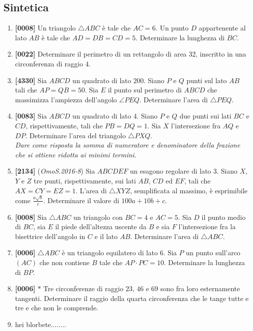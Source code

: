 \documentclass[10pt]{article}
\begin{document}
\subsection{Sintetica}
\begin{enumerate}

	\item \textbf{[0008]} Un triangolo $\triangle ABC$ è tale che $AC=6$. Un punto $D$ appartenente al lato $AB$ è tale che $AD=DB=CD=5$. Determinare la lunghezza di $BC$.

	\item \textbf{[0022]} Determinare il perimetro di un rettangolo di area 32, inscritto in una circonferenza di raggio 4.

	\item \textbf{[4330]} Sia $ABCD$ un quadrato di lato $200$. Siano $P$ e $Q$ punti sul lato $AB$ tali che $AP=QB=50$. Sia $E$ il punto sul perimetro di $ABCD$ che massimizza l'ampiezza dell'angolo $\angle PEQ$. Determinare l'area di $\triangle PEQ$.

	\item \textbf{[0083]} Sia $ABCD$ un quadrato di lato 4. Siano $P$ e $Q$ due punti sui lati $BC$ e $CD$, rispettivamente, tali che $PB=DQ=1$. Sia $X$ l'intersezione fra $AQ$ e $DP$. Determinare l'area del triangolo $\triangle PXQ$.\\
		\textit{Dare come risposta la somma di numeratore e denominatore della frazione che si ottiene ridotta ai minimi termini.}

	\item \textbf{[2134]} (\textit{OmoS.2016-8}) Sia $ABCDEF$ un esagono regolare di lato 3. Siano $X$, $Y$ e $Z$ tre punti, rispettivamente, sui lati $AB$, $CD$ ed $EF$, tali che $AX=CY=EZ=1$. L'area di $\triangle XYZ$, semplificata al massimo, è esprimibile come $\frac{a\sqrt{b}}{c}$. Determinare il valore di $100a+10b+c$.

	\item \textbf{[0008]} Sia $\triangle ABC$ un triangolo con $BC=4$ e $AC=5$. Sia $D$ il punto medio di $BC$, sia $E$ il piede dell'altezza uscente da $B$ e sia $F$ l'intersezione fra la bisettrice dell'angolo in $C$ e il lato $AB$. Determinare l'area di $\triangle ABC$.

	\item \textbf{[0006]} $\triangle ABC$ è un triangolo equilatero di lato 6. Sia $P$ un punto sull'arco $(AC)$ che non contiene $B$ tale che $AP\cdot PC=10$. Determinare la lunghezza di $BP$.

	\item \textbf{[0006]} $\ast$ Tre circonferenze di raggio $23$, $46$ e $69$ sono fra loro esternamente tangenti. Determinare il raggio della quarta circonferenza che le tange tutte e tre e che non le comprende.

	\item hei blorbete........

\end{enumerate}
\end{document}
